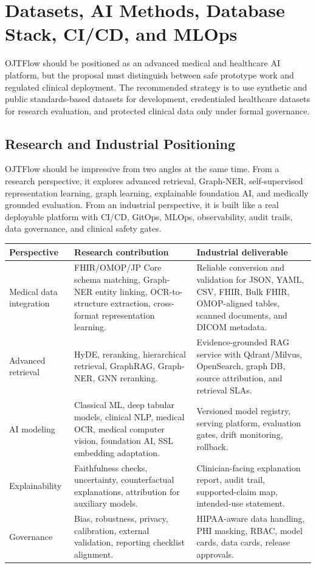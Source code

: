 \section{Datasets, AI Methods, Database Stack, CI/CD, and MLOps}

OJTFlow should be positioned as an advanced medical and healthcare AI platform, but the proposal must distinguish between safe prototype work and regulated clinical deployment. The recommended strategy is to use synthetic and public standards-based datasets for development, credentialed healthcare datasets for research evaluation, and protected clinical data only under formal governance.

\subsection{Research and Industrial Positioning}

OJTFlow should be impressive from two angles at the same time. From a research perspective, it explores advanced retrieval, Graph-NER, self-supervised representation learning, graph learning, explainable foundation AI, and medically grounded evaluation. From an industrial perspective, it is built like a real deployable platform with CI/CD, GitOps, MLOps, observability, audit trails, data governance, and clinical safety gates.

\begin{tabularx}{\textwidth}{p{}X X}
\toprule
\textbf{Perspective} & \textbf{Research contribution} & \textbf{Industrial deliverable} \\
\midrule
Medical data integration & FHIR/OMOP/JP Core schema matching, Graph-NER entity linking, OCR-to-structure extraction, cross-format representation learning. & Reliable conversion and validation for JSON, YAML, CSV, FHIR, Bulk FHIR, OMOP-aligned tables, scanned documents, and DICOM metadata. \\
Advanced retrieval & HyDE, reranking, hierarchical retrieval, GraphRAG, Graph-NER, GNN reranking. & Evidence-grounded RAG service with Qdrant/Milvus, OpenSearch, graph DB, source attribution, and retrieval SLAs. \\
AI modeling & Classical ML, deep tabular models, clinical NLP, medical OCR, medical computer vision, foundation AI, SSL embedding adaptation. & Versioned model registry, serving platform, evaluation gates, drift monitoring, rollback. \\
Explainability & Faithfulness checks, uncertainty, counterfactual explanations, attribution for auxiliary models. & Clinician-facing explanation report, audit trail, supported-claim map, intended-use statement. \\
Governance & Bias, robustness, privacy, calibration, external validation, reporting checklist alignment. & HIPAA-aware data handling, PHI masking, RBAC, model cards, data cards, release approvals. \\
\bottomrule
\end{tabularx}

